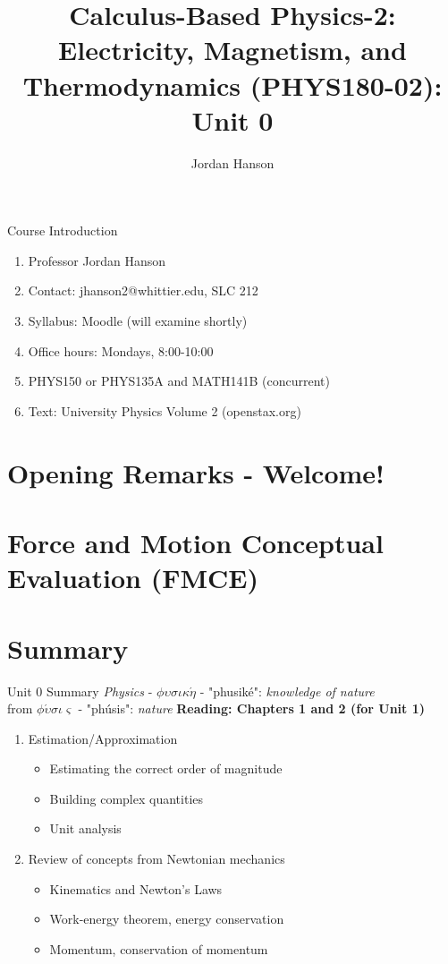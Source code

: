 \documentclass{beamer}
\title{Calculus-Based Physics-2: Electricity, Magnetism, and Thermodynamics (PHYS180-02): Unit 0}
\author{Jordan Hanson}
\institute{Whittier College Department of Physics and Astronomy}
\begin{document}
\maketitle

\begin{frame}{Course Introduction}
\begin{enumerate}
\item Professor Jordan Hanson
\item Contact: jhanson2@whittier.edu, SLC 212
\item Syllabus: Moodle (will examine shortly)
\item Office hours: Mondays, 8:00-10:00
\item PHYS150 or PHYS135A and MATH141B (concurrent)
\item Text: University Physics Volume 2 (openstax.org)
\end{enumerate}
\end{frame}

\section{Opening Remarks - Welcome!}

\section{Force and Motion Conceptual Evaluation (FMCE)}

\section{Summary}

\begin{frame}{Unit 0 Summary}
\textit{Physics} - $\phi\upsilon\sigma\iota\kappa\acute{\eta}$ - "phusik\'e": \textit{knowledge of nature} \\
from $\phi\acute{\upsilon}\sigma\iota\varsigma$ - "ph\'usis": \textit{nature}
\textbf{Reading: Chapters 1 and 2 (for Unit 1)}
\begin{enumerate}
\item Estimation/Approximation
\begin{itemize}
\item \alert{Estimating} the correct order of magnitude
\item \alert{Building} complex quantities
\item \alert{Unit analysis}
\end{itemize}
\item Review of concepts from Newtonian mechanics
\begin{itemize}
\item Kinematics and \alert{Newton's Laws}
\item Work-energy theorem, energy conservation
\item Momentum, conservation of momentum
\end{itemize}
\end{enumerate}
\end{frame}
\end{document}
